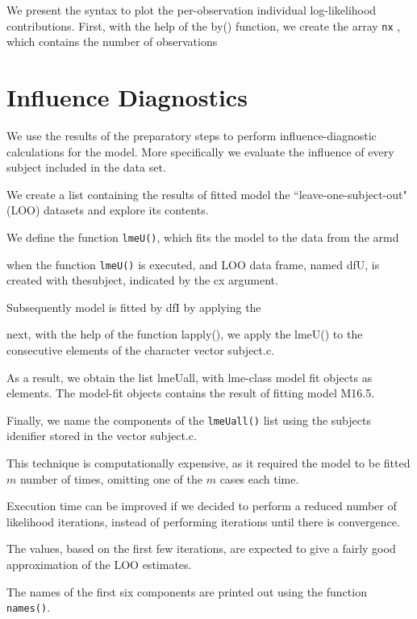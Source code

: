 \documentclass[a4paper,12pt]{article}
\begin{document}
We present the syntax to plot the per-observation individual log-likelihood contributions.
First, with the help of the by() function, we create the array \texttt{nx} , which contains the number
of observations


\section{Influence Diagnostics}

We use the results of the preparatory steps to perform influence-diagnostic calculations for the model.
More specifically we evaluate the influence of every subject included in the data set.


We create a list containing the results of fitted model the ``leave-one-subject-out" (LOO)
datasets and explore its contents.

We define the function \texttt{lmeU()}, which fits the model to the data from the armd

when the function \texttt{lmeU()} is executed, and LOO data frame, named dfU, is created with thesubject, indicated by the cx argument.

Subsequently model is fitted by dfI by applying the 


next, with the help of the function lapply(), we apply the lmeU() to the consecutive elements of the character vector subject.c.

As a result, we obtain the list lmeUall, with lme-class model fit objects as elements. The model-fit objects contains the result of fitting model
M16.5.

Finally, we name the components of the \texttt{lmeUall()} list using the subjects idenifier stored in the vector subject.c.

This technique is computationally expensive, as it required the model to be fitted $m$ number of times, omitting one of the $m$ cases each time.

Execution time can be improved if we decided to perform a reduced number of likelihood iterations, instead of performing iterations until there is convergence.

The values, based on the first few iterations, are expected to give a fairly good approximation of the LOO estimates.


The names of the first six components are printed out using the function \texttt{names()}.
\end{document}
